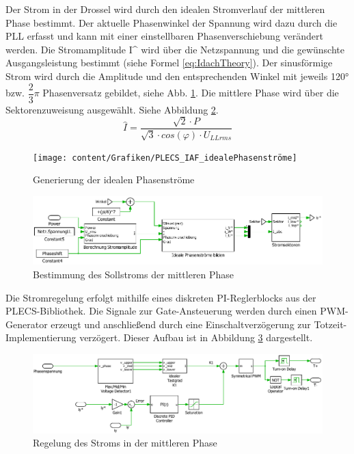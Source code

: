 			Der Strom in der Drossel wird durch den idealen Stromverlauf der mittleren Phase bestimmt. Der aktuelle Phasenwinkel der Spannung wird dazu durch die PLL erfasst und kann mit einer einstellbaren Phasenverschiebung verändert werden. Die Stromamplitude \gls{I^} wird über die Netzspannung und die gewünschte Ausgangsleistung bestimmt (siehe Formel \ref{eq:IdachTheory}). Der sinusförmige Strom wird durch die Amplitude und den entsprechenden Winkel mit jeweils 120° bzw. $\dfrac{2}{3}\pi$ Phasenversatz gebildet, siehe Abb. \ref{fig:plecsiafidealephasenstrome}. Die mittlere Phase wird über die Sektorenzuweisung ausgewählt. Siehe Abbildung \ref{fig:plecsiafiy}.
			\begin{equation}
				\label{eq:IdachTheory}
				\hat{I} = \dfrac{\sqrt{2} \cdot P   }{ \sqrt{3} \cdot cos(\varphi) \cdot  U_{LLrms} } 
			\end{equation}
		\begin{figure}
			\centering
			\texttt{[image: content/Grafiken/PLECS\_IAF\_idealePhasenströme]}
			\caption{Generierung der idealen Phasenströme}
			\label{fig:plecsiafidealephasenstrome}
		\end{figure}
		
		
		\begin{figure}
			\centering
			\includegraphics[width=1\linewidth]{content/Grafiken/PlecsIAFiy}
			\caption{Bestimmung des Sollstroms der mittleren Phase}
			\label{fig:plecsiafiy}
		\end{figure}
		
Die Stromregelung erfolgt mithilfe eines diskreten PI-Reglerblocks aus der PLECS-Bibliothek. Die Signale zur Gate-Ansteuerung werden durch einen PWM-Generator erzeugt und anschließend durch eine Einschaltverzögerung zur Totzeit-Implementierung verzögert. Dieser Aufbau ist in Abbildung \ref{fig:plecsiafivsk1} dargestellt. 
		\begin{figure}
			\centering
			\includegraphics[width=1\linewidth]{content/Grafiken/PlecsIAFivsK1}
			\caption{Regelung des Stroms in der mittleren Phase}
			\label{fig:plecsiafivsk1}
		\end{figure}
		
